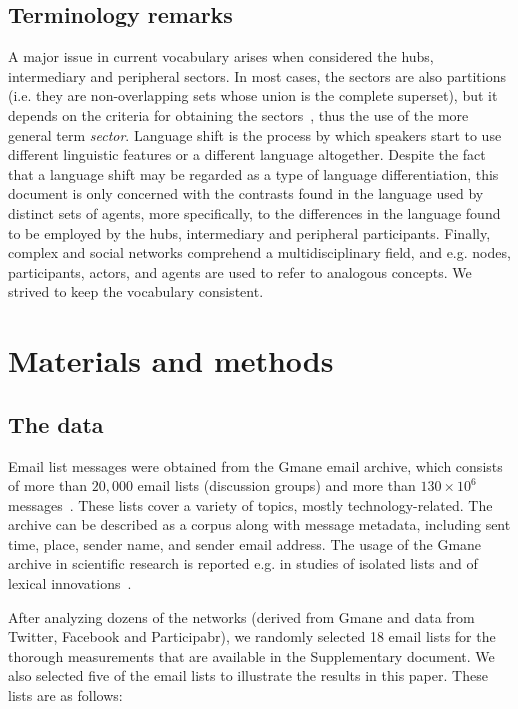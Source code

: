 \documentclass[review]{elsarticle}
\begin{document}
\subsection{Terminology remarks}
A major issue in current vocabulary arises when considered the hubs, intermediary and peripheral sectors.
In most cases, the sectors are also partitions
(i.e. they are non-overlapping sets whose union is the complete superset),
but it depends on the criteria for obtaining the sectors~\cite{stab},
thus the use of the more general term \emph{sector}.
Language shift is the process by which speakers start to use different linguistic features or a different language altogether.
Despite the fact that a language shift may be regarded as a type of language differentiation, this document
is only concerned with the contrasts found in the language used by distinct sets of agents,
more specifically, to the differences in the language found to be employed by the hubs, intermediary and peripheral participants.
Finally, complex and social networks comprehend a multidisciplinary field,
and e.g. nodes, participants, actors, and agents are used to refer to analogous concepts.
We strived to keep the vocabulary consistent.

\section{Materials and methods}\label{smm}
\subsection{The data}
Email list messages were obtained from
the Gmane email archive, which consists of more than $20,000$
email lists (discussion groups) and more than $130\times 10^6$ messages~\cite{GMANEwikipedia}.
These lists cover a variety of topics, mostly technology-related.
The archive can be described as a corpus along with message metadata,
including sent time, place, sender name, and sender email address.
The usage of the Gmane archive in scientific research is
reported e.g. in studies of isolated lists and of lexical innovations~\cite{Gmane2,bird}. 

After analyzing dozens of the networks
(derived from Gmane and data from Twitter, Facebook and Participabr),
we randomly selected 18 email lists for the thorough measurements that are available in the Supplementary document.
We also selected five of the email lists
to illustrate the results in this paper.
These lists are as follows:
\end{document}
